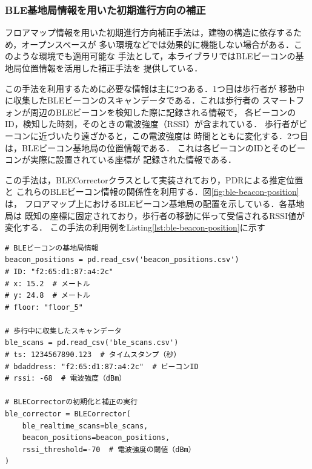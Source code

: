 

\subsubsection{BLE基地局情報を用いた初期進行方向の補正}




フロアマップ情報を用いた初期進行方向補正手法は，建物の構造に依存するため，オープンスペースが
多い環境などでは効果的に機能しない場合がある．このような環境でも適用可能な
手法として，本ライブラリではBLEビーコンの基地局位置情報を活用した補正手法を
提供している．

この手法を利用するために必要な情報は主に2つある．1つ目は歩行者が
移動中に収集したBLEビーコンのスキャンデータである．これは歩行者の
スマートフォンが周辺のBLEビーコンを検知した際に記録される情報で，
各ビーコンのID，検知した時刻，そのときの電波強度（RSSI）が含まれている．
歩行者がビーコンに近づいたり遠ざかると，この電波強度は
時間とともに変化する．2つ目は，BLEビーコン基地局の位置情報である．
これは各ビーコンのIDとそのビーコンが実際に設置されている座標が
記録された情報である．

この手法は，BLECorrectorクラスとして実装されており，PDRによる推定位置と
これらのBLEビーコン情報の関係性を利用する．図\ref{fig:ble-beacon-position}は，
フロアマップ上におけるBLEビーコン基地局の配置を示している．各基地局は
既知の座標に固定されており，歩行者の移動に伴って受信されるRSSI値が変化する．
この手法の利用例をListing\ref{lst:ble-beacon-position}に示す

\begin{lstlisting}[caption={BLECorrector},label=lst:ble-beacon-position,float=h]
# BLEビーコンの基地局情報
beacon_positions = pd.read_csv('beacon_positions.csv')
# ID: "f2:65:d1:87:a4:2c"
# x: 15.2  # メートル
# y: 24.8  # メートル
# floor: "floor_5"

# 歩行中に収集したスキャンデータ
ble_scans = pd.read_csv('ble_scans.csv')
# ts: 1234567890.123  # タイムスタンプ（秒）
# bdaddress: "f2:65:d1:87:a4:2c"  # ビーコンID
# rssi: -68  # 電波強度（dBm）

# BLECorrectorの初期化と補正の実行
ble_corrector = BLECorrector(
    ble_realtime_scans=ble_scans,
    beacon_positions=beacon_positions,
    rssi_threshold=-70  # 電波強度の閾値（dBm）
)
\end{lstlisting}



